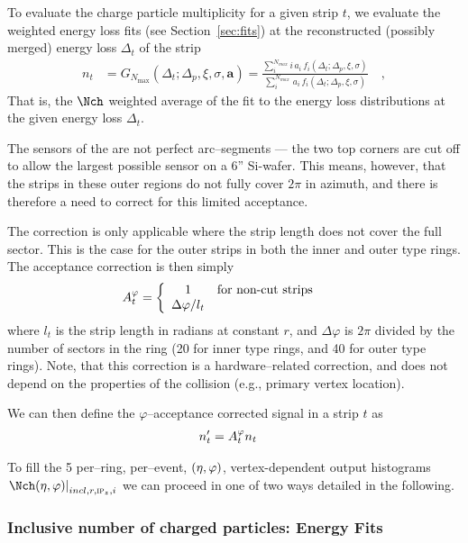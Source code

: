 \documentclass[compat,11pt]{alicenote}
\newcommand*{\etaphi}{\ensuremath(\eta,\varphi)}
\newcommand{\secref}[1]{Section~\ref{#1}}
\newcommand{\dndetadphi}[1][]{{\ensuremath%
    \ifx|#1|\else\left.\fi%
      \Nch\etaphi%
      \ifx|#1|\else\right|_{#1}\fi}}
\newcommand{\Corners}{\ensuremath A^{\varphi}_{t}}
\begin{document}
To evaluate the charge particle multiplicity for a given strip $t$, we
evaluate the weighted energy loss fits (see \secref{sec:fits}) at the
reconstructed (possibly merged) energy loss $\Delta_t$ of the strip 
\begin{align}
  \label{eq:nt}
  n_t &= G_{N_{\text{max}}}(\Delta_t;\Delta_p,\xi,\sigma,\mathbf{a}) =
  \frac{\sum_i^{N_{max}} i\,a_i\,f_i(\Delta_t;\Delta_p,\xi,\sigma)}{
    \sum_i^{N_{max}}\,a_i\,f_i(\Delta_t;\Delta_p,\xi,\sigma)}\quad,
\end{align}
That is, the $\Nch$ weighted average of the fit to the energy loss
distributions at the given energy loss $\Delta_t$. 

The sensors of the \FMD{} are not perfect arc--segments
\cite{cholm:2009} --- the two top corners are cut off to allow the
largest possible sensor on a 6'' Si-wafer.  This means, however, that
the strips in these outer regions do not fully cover $2\pi$ in
azimuth, and there is therefore a need to correct for this limited
acceptance.

The correction is only applicable where the strip length does not
cover the full sector.  This is the case for the outer strips in both
the inner and outer type rings.  The acceptance correction is then
simply
\begin{align}
  \label{eq:acc_corr}
  \Corners{} &=
     \left\{
       \begin{array}{cl}
         1 & \text{for non-cut strips}\\
         \Delta\varphi/l_t & \\
       \end{array}\right.
     \quad
\end{align}
where $l_t$ is the strip length in radians at constant $r$, and
$\Delta\varphi$ is $2\pi$ divided by the number of sectors in the ring
(20 for inner type rings, and 40 for outer type rings). Note, that
this correction is a hardware--related correction, and does not depend
on the properties of the collision (e.g., primary vertex location).

We can then define the $\varphi$--acceptance corrected signal in a strip
$t$ as 
\begin{align}
  n'_t &= \Corners{} n_t
\end{align}

To fill the 5 per--ring, per--event, $\etaphi$, vertex-dependent
output histograms $\dndetadphi[incl,r,\subIPz,i]$ we can proceed in
one of two ways detailed in the following.

\subsubsection{Inclusive number of charged particles: Energy Fits} 
\label{sec:sub:sub:eloss_fits}
\end{document}

